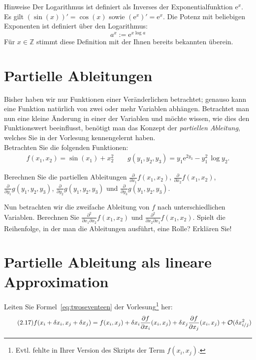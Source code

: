 \documentclass{scrartcl}
\begin{document}
\begin{remark}{Hinweise}
  Der Logarithmus ist definiert als Inverses der Exponentialfunktion $\mathrm{e}^x$.
  Es gilt $(\sin(x))' = \cos(x)$ sowie $\left( \mathrm{e}^x \right)' = \mathrm{e}^x$.
  Die Potenz mit beliebigen Exponenten ist definiert über den Logarithmus:
  \[
    a^x := \mathrm{e}^{x \log a}
  \]
  Für $x \in \mathbb{Z}$ stimmt diese Definition mit der Ihnen bereits bekannten überein. 
\end{remark}

\section{Partielle Ableitungen }
\label{sec:partielle_ableitungen}
Bisher haben wir nur Funktionen einer Veränderlichen betrachtet; genauso kann eine Funktion natürlich von zwei oder mehr Variablen abhängen. 
Betrachtet man nun eine kleine Änderung in einer der Variablen und möchte wissen, wie dies den Funktionswert beeinflusst, benötigt man das Konzept der \emph{partiellen Ableitung}, welches Sie in der Vorlesung kennengelernt haben.\\
Betrachten Sie die folgenden Funktionen:
\begin{align*}
f(x_1,x_2)=\sin(x_1)+x_2^2 \qquad g(y_1,y_2,y_3)= y_1 \mathrm{e}^{2 y_3}-y_1^2 \, \log y_2.
\end{align*}

\begin{subex}
\item{} Berechnen Sie die partiellen Ableitungen $\frac{\partial}{\partial x_1}f(x_1,x_2)$, $\frac{\partial}{\partial x_2}f(x_1,x_2)$, $\frac{\partial}{\partial y_1} g(y_1,y_2,y_3)$, $\frac{\partial}{\partial y_2} g(y_1,y_2,y_3)$ und $\frac{\partial}{\partial y_3}g(y_1,y_2,y_3)$.
\item{} Nun betrachten wir die zweifache Ableitung von $f$ nach unterschiedlichen Variablen. Berechnen Sie $\frac{\partial^2}{\partial x_1\partial x_2}f(x_1,x_2)$ und $\frac{\partial^2}{\partial x_2\partial x_1}f(x_1,x_2)$.
Spielt die Reihenfolge, in der man die Ableitungen ausführt, eine Rolle?
Erklären Sie!
\end{subex}

\section{Partielle Ableitung als lineare Approximation }
\label{sec:partielle_ableitung_als_lineare_approximation}

Leiten Sie Formel~\eqref{eq:twoseventeen} der Vorlesung\footnote{%
  Evtl. fehlte in Ihrer Version des Skripts der Term $f(x_i, x_j)$.
} her:
\begin{equation}
  \tag{2.17}
  \label{eq:twoseventeen}
  f(x_i + \delta x_i, x_j + \delta x_j) = f(x_i, x_j) + \delta x_i \pderiv[f]{x_i}(x_i, x_j) + \delta x_j \pderiv[f]{x_j}(x_i, x_j) + \mathcal{O}(\delta x_{i/j}^2)
\end{equation}
\end{document}

